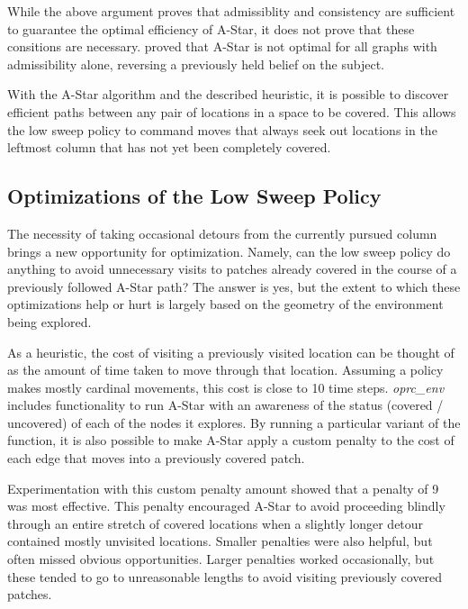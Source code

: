
While the above argument proves that admissiblity and consistency are sufficient to guarantee the optimal efficiency of A-Star, it does not prove that these consitions are necessary. \citeauthor{AStarOpt} proved that A-Star is not optimal for all graphs with admissibility alone, reversing a previously held belief on the subject.

With the A-Star algorithm and the described heuristic, it is possible to discover efficient paths between any pair of locations in a space to be covered. This allows the low sweep policy to command moves that always seek out locations in the leftmost column that has not yet been completely covered. 

\subsection{Optimizations of the Low Sweep Policy}


The necessity of taking occasional detours from the currently pursued column brings a new opportunity for optimization. Namely, can the low sweep policy do anything to avoid unnecessary visits to patches already covered in the course of a previously followed A-Star path? The answer is yes, but the extent to which these optimizations help or hurt is largely based on the geometry of the environment being explored.

As a heuristic, the cost of visiting a previously visited location can be thought of as the amount of time taken to move through that location. Assuming a policy makes mostly cardinal movements, this cost is close to 10 time steps. \textit{oprc\_env} includes functionality to run A-Star with an awareness of the status (covered / uncovered) of each of the nodes it explores. By running a particular variant of the function, it is also possible to make A-Star apply a custom penalty to the cost of each edge that moves into a previously covered patch.

Experimentation with this custom penalty amount showed that a penalty of 9 was most effective. This penalty encouraged A-Star to avoid proceeding blindly through an entire stretch of covered locations when a slightly longer detour contained mostly unvisited locations. Smaller penalties were also helpful, but often missed obvious opportunities. Larger penalties worked occasionally, but these tended to go to unreasonable lengths to avoid visiting previously covered patches.

